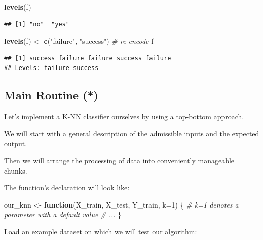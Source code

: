 \documentclass[10pt,b5paper,krantz1]{krantz}
\newenvironment{Shaded}{\begin{snugshade}}{\end{snugshade}}
\newcommand{\CommentTok}[1]{\textcolor[rgb]{0.37,0.37,0.37}{\textit{#1}}}
\newcommand{\ControlFlowTok}[1]{\textcolor[rgb]{0.27,0.27,0.27}{\textbf{#1}}}
\newcommand{\DataTypeTok}[1]{\textcolor[rgb]{0.27,0.27,0.27}{#1}}
\newcommand{\DecValTok}[1]{\textcolor[rgb]{0.06,0.06,0.06}{#1}}
\newcommand{\KeywordTok}[1]{\textcolor[rgb]{0.27,0.27,0.27}{\textbf{#1}}}
\newcommand{\NormalTok}[1]{#1}
\newcommand{\StringTok}[1]{\textcolor[rgb]{0.5,0.5,0.5}{#1}}
\begin{document}
\begin{Shaded}
\begin{Highlighting}[]
\KeywordTok{levels}\NormalTok{(f)}
\end{Highlighting}
\end{Shaded}

\begin{verbatim}
## [1] "no"  "yes"
\end{verbatim}

\begin{Shaded}
\begin{Highlighting}[]
\KeywordTok{levels}\NormalTok{(f) <-}\StringTok{ }\KeywordTok{c}\NormalTok{(}\StringTok{"failure"}\NormalTok{, }\StringTok{"success"}\NormalTok{) }\CommentTok{# re-encode}
\NormalTok{f}
\end{Highlighting}
\end{Shaded}

\begin{verbatim}
## [1] success failure failure success failure
## Levels: failure success
\end{verbatim}

\hypertarget{main-routine}{%
\subsection{Main Routine (*)}\label{main-routine}}

Let's implement a K-NN classifier ourselves
by using a top-bottom approach.

We will start with a general description of the admissible inputs
and the expected output.

Then we will arrange the processing of data into
conveniently manageable chunks.

The function's declaration will look like:

\begin{Shaded}
\begin{Highlighting}[]
\NormalTok{our_knn <-}\StringTok{ }\ControlFlowTok{function}\NormalTok{(X_train, X_test, Y_train, }\DataTypeTok{k=}\DecValTok{1}\NormalTok{) \{}
    \CommentTok{# k=1 denotes a parameter with a default value}
    \CommentTok{# ...}
\NormalTok{\}}
\end{Highlighting}
\end{Shaded}

Load an example dataset on which we will test our algorithm:
\end{document}

